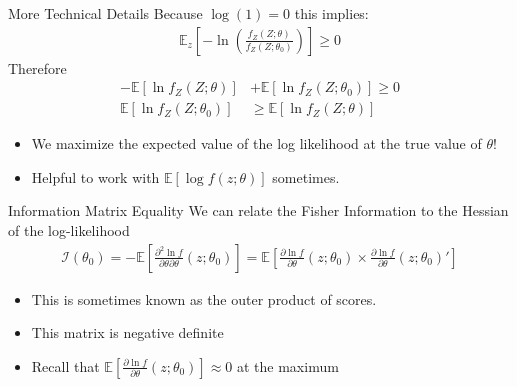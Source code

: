 \documentclass[aspectratio=169]{beamer}
\begin{document}
\begin{frame}{More Technical Details}
Because $\log(1)=0$ this implies:
\begin{align*}
\mathbb { E }_z \left[ - \ln \left( \frac { f _ { Z } ( Z ; \theta ) } { f _ { Z } \left( Z ; \theta _ { 0 } \right) } \right) \right] \geq 0
\end{align*}
Therefore 
\begin{align*}
- \mathbb { E } \left[ \ln f _ { Z } ( Z ; \theta ) \right] &+ \mathbb { E } \left[ \ln f _ { Z } \left( Z ; \theta _ { 0 } \right) \right] \geq 0\\
\mathbb { E } \left[ \ln f _ { Z } \left( Z ; \theta _ { 0 } \right) \right] &\geq \mathbb { E } \left[ \ln f _ { Z } ( Z ; \theta ) \right]
\end{align*}
\begin{itemize}
\item We maximize the expected value of the log likelihood at the true value of $\theta$!
\item Helpful to work with $\mathbb{E}[\log f(z; \theta)]$ sometimes.
\end{itemize}
\end{frame}


\begin{frame}{Information Matrix Equality}
We can relate the \alert{Fisher Information} to the Hessian of the log-likelihood
\begin{align*}
\mathcal { I } \left( \theta _ { 0 } \right) = - \mathbb { E } \left[ \frac { \partial ^ { 2 } \ln f } { \partial \theta \partial \theta } \left( z ; \theta _ { 0 } \right) \right] 
= \mathbb { E } \left[ \frac { \partial \ln f } { \partial \theta } \left( z ; \theta _ { 0 } \right) \times \frac { \partial \ln f } { \partial \theta  } \left( z ; \theta _ { 0 } \right)' \right]
\end{align*}
\begin{itemize}
    \item This is sometimes known as the \alert{outer product of scores}.
    \item This matrix is \alert{negative definite}
    \item Recall that $ \mathbb { E } \left[ \frac { \partial \ln f } { \partial \theta } \left( z ; \theta _ { 0 } \right) \right]\approx 0$ at the maximum
\end{itemize}
\end{frame}
\end{document}
